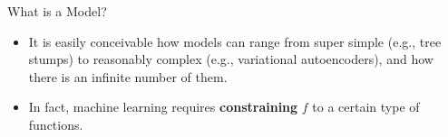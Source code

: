 \documentclass[11pt,compress,t,notes=noshow, xcolor=table]{beamer}
\begin{document}
\begin{vbframe}{What is a Model?}
\begin{itemize}
  
  \item It is easily conceivable how models can range from super simple (e.g.,
  tree stumps) to reasonably complex (e.g., variational autoencoders), and how 
  there is an infinite number of them.
  
  \item In fact, machine learning requires \textbf{constraining} $f$ to a 
  certain type of functions.

\end{itemize}


% 
%   
%   
%   
%   
%   
%   
%   
%   
% 
% 

\end{vbframe}
\end{document}
